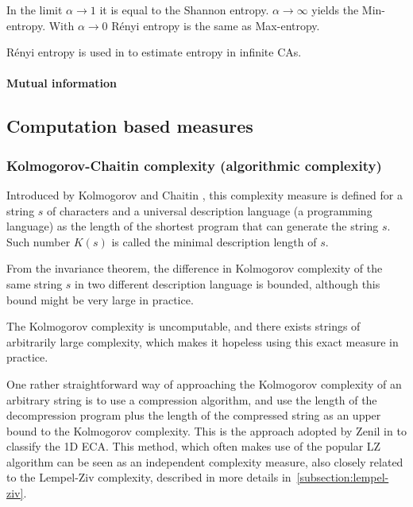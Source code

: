 In the limit $\alpha \rightarrow 1$ it is equal to the Shannon entropy. $\alpha
\rightarrow \infty$ yields the Min-entropy. With $\alpha \rightarrow 0$ Rényi
entropy is the same as Max-entropy.

Rényi entropy is used in \parencite{wolframStatisticalMechanicsCellular1983} to
estimate entropy in infinite CAs.

\paragraph{Mutual information}

\subsection{Computation based measures}

\subsubsection{Kolmogorov-Chaitin complexity {\small (algorithmic complexity)}}

Introduced by Kolmogorov \parencite{kolmogorovThreeApproachesQuantitative1968} and Chaitin
\parencite{chaitinLengthProgramsComputing1969}, this complexity measure is defined for a string $s$
of characters and a universal description language (\eg a programming language)
as the length of the shortest program that can generate the string $s$. Such
number $K(s)$ is called the minimal description length of $s$.

From the invariance theorem, the difference in Kolmogorov complexity of the same
string $s$ in two different description language is bounded, although this bound
might be very large in practice.

The Kolmogorov complexity is uncomputable, and there exists strings of
arbitrarily large complexity, which makes it hopeless using this exact measure
in practice.

One rather straightforward way of approaching the Kolmogorov complexity of an
arbitrary string is to use a compression algorithm, and use the length of the
decompression program plus the length of the compressed string as an upper bound
to the Kolmogorov complexity. This is the approach adopted by Zenil in
\parencite{zenilCompressionBasedInvestigationDynamical2010} to classify the 1D ECA. This method, which
often makes use of the popular LZ algorithm can be seen as an independent
complexity measure, also closely related to the Lempel-Ziv complexity, described
in more details in~\ref{subsection:lempel-ziv}.


